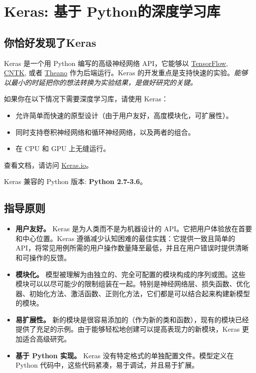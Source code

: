 \section{Keras: 基于 Python的深度学习库}\label{keras-ux57faux4e8e-python-ux7684ux6df1ux5ea6ux5b66ux4e60ux5e93}

\subsection{你恰好发现了Keras}\label{ux4f60ux6070ux597dux53d1ux73b0ux4e86-keras}

Keras 是一个用 Python 编写的高级神经网络 API，它能够以
\href{https://github.com/tensorflow/tensorflow}{TensorFlow},
\href{https://github.com/Microsoft/cntk}{CNTK}, 或者
\href{https://github.com/Theano/Theano}{Theano} 作为后端运行。Keras
的开发重点是支持快速的实验。\emph{能够以最小的时延把你的想法转换为实验结果，是做好研究的关键。}

如果你在以下情况下需要深度学习库，请使用 Keras：

\begin{itemize}
\tightlist
\item
  允许简单而快速的原型设计（由于用户友好，高度模块化，可扩展性）。
\item
  同时支持卷积神经网络和循环神经网络，以及两者的组合。
\item
  在 CPU 和 GPU 上无缝运行。
\end{itemize}

查看文档，请访问 \href{https://keras.io/zh/}{Keras.io}。

Keras 兼容的 Python 版本: \textbf{Python 2.7-3.6}。


\subsection{指导原则}\label{ux6307ux5bfcux539fux5219}

\begin{itemize}
\item
  \textbf{用户友好。} Keras 是为人类而不是为机器设计的
  API。它把用户体验放在首要和中心位置。Keras
  遵循减少认知困难的最佳实践：它提供一致且简单的
  API，将常见用例所需的用户操作数量降至最低，并且在用户错误时提供清晰和可操作的反馈。
\item
  \textbf{模块化。}
  模型被理解为由独立的、完全可配置的模块构成的序列或图。这些模块可以以尽可能少的限制组装在一起。特别是神经网络层、损失函数、优化器、初始化方法、激活函数、正则化方法，它们都是可以结合起来构建新模型的模块。
\item
  \textbf{易扩展性。}
  新的模块是很容易添加的（作为新的类和函数），现有的模块已经提供了充足的示例。由于能够轻松地创建可以提高表现力的新模块，Keras
  更加适合高级研究。
\item
  \textbf{基于 Python 实现。} Keras
  没有特定格式的单独配置文件。模型定义在 Python
  代码中，这些代码紧凑，易于调试，并且易于扩展。
\end{itemize}



